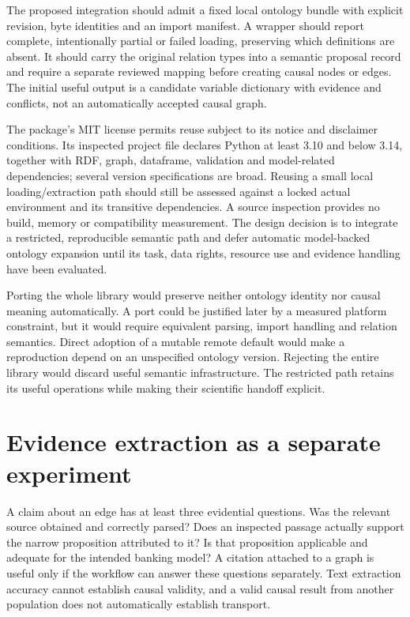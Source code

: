 The proposed integration should admit a fixed local ontology bundle with
explicit revision, byte identities and an import manifest. A wrapper
should report complete, intentionally partial or failed loading,
preserving which definitions are absent. It should carry the original
relation types into a semantic proposal record and require a separate
reviewed mapping before creating causal nodes or edges. The initial
useful output is a candidate variable dictionary with evidence and
conflicts, not an automatically accepted causal graph.

The package's MIT license permits reuse subject to its notice and
disclaimer conditions. Its inspected project file declares Python at
least 3.10 and below 3.14, together with RDF, graph, dataframe,
validation and model-related dependencies; several version
specifications are broad. Reusing a small local loading/extraction path
should still be assessed against a locked actual environment and its
transitive dependencies. A source inspection provides no build, memory
or compatibility measurement. The design decision is to integrate a
restricted, reproducible semantic path and defer automatic model-backed
ontology expansion until its task, data rights, resource use and
evidence handling have been evaluated.
\citep{v12_la_package_ontolearner}

Porting the whole library would preserve neither ontology identity nor
causal meaning automatically. A port could be justified later by a
measured platform constraint, but it would require equivalent parsing,
import handling and relation semantics. Direct adoption of a mutable
remote default would make a reproduction depend on an unspecified
ontology version. Rejecting the entire library would discard useful
semantic infrastructure. The restricted path retains its useful
operations while making their scientific handoff explicit.

\hypertarget{evidence-extraction-as-a-separate-experiment}{%
\section{Evidence extraction as a separate
experiment}\label{evidence-extraction-as-a-separate-experiment}}

A claim about an edge has at least three evidential questions. Was the
relevant source obtained and correctly parsed? Does an inspected passage
actually support the narrow proposition attributed to it? Is that
proposition applicable and adequate for the intended banking model? A
citation attached to a graph is useful only if the workflow can answer
these questions separately. Text extraction accuracy cannot establish
causal validity, and a valid causal result from another population does
not automatically establish transport.

